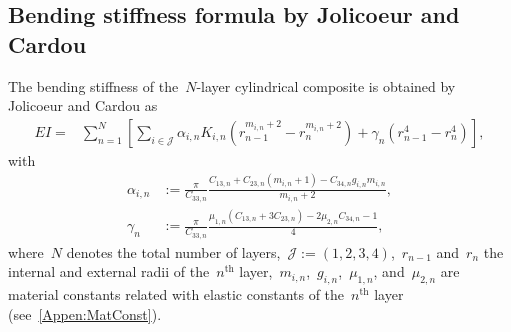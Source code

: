 \documentclass[preprint,10pt,times]{elsarticle}
\numberwithin{equation}{section}
\newcommand{\pr}[1]{\left( #1 \right)}
\renewcommand{\>}{$\Rightarrow$}
\begin{document}
\subsection{Bending stiffness formula by Jolicoeur and Cardou}
\label{sec:bending stiffness}
The bending stiffness of the~$N$-layer cylindrical composite is obtained by Jolicoeur and Cardou as
\begin{equation}
	\begin{aligned}
	EI = & \sum_{n=1}^{N} \left[ \sum_{i \in \mathcal{J}} \alpha_{i,n} K_{i,n}  (r_{n-1}^{m_{i,n}+2} - r_{n}^{m_{i,n}+2}) + \gamma_n(r_{n-1}^4 - r_n^4) \right],
	\end{aligned}
	\label{eq:EI}
\end{equation}
with
\begin{subequations}
	\begin{align}
	\alpha_{i,n} & := \frac{\pi}{C_{33,n}} \frac{  C_{13,n} + C_{23,n}(m_{i,n} + 1) - C_{34,n} g_{i,n} m_{i,n} }{m_{i,n}+2}, \\
	\gamma_n & := \frac{\pi}{C_{33,n}} \frac{ \mu_{1,n} (C_{13,n} + 3C_{23,n}) - 2\mu_{2,n} C_{34,n} - 1  }{4},
	\end{align}
\end{subequations}
where~$N$ denotes the total number of layers,~$\mathcal{J} := \pr{1,2,3,4}$,~$r_{n-1}$ and~$r_{n}$ the internal and external radii of the~$n^\text{th}$ layer,~$m_{i,n}$,~$g_{i,n}$,~$\mu_{1,n}$, and~$\mu_{2,n}$ are material constants related with elastic constants of the~$n^\text{th}$ layer (see~\ref{Appen:MatConst}).
\end{document}
